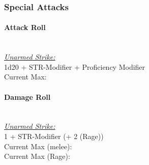 \documentclass[letterpaper,openany,oneside,twocolumn]{book}
\begin{document}
\subsubsection*{Special Attacks}
\paragraph*{Attack Roll}\hfill\\
\underline{\textit{Unarmed Strike:}}\\
1d20 + STR-Modifier + Proficiency Modifier\\
\indent Current Max: 
\paragraph*{Damage Roll}\hfill\\
\underline{\textit{Unarmed Strike:}}\\
1 + STR-Modifier (+ 2 (Rage))\\
\indent Current Max (melee): \\
\indent Current Max (Rage): 
\end{document}
